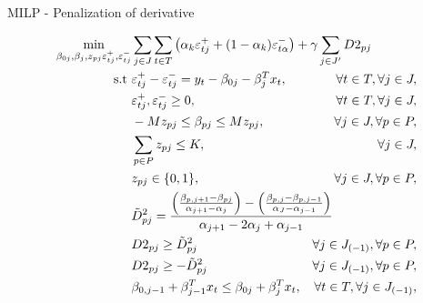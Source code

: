 \begin{frame}{MILP - Penalization of derivative}

\small

\begin{eqnarray*}
 \underset{\beta_{0j},\beta_j,z_{p j} \varepsilon_{t j}^{+},\varepsilon_{t j}^{-}}{\text{min}} & \sum_{j \in J} \sum_{t\in T}\left(\alpha_k \varepsilon_{t j}^{+}+(1-\alpha_k)\varepsilon_{t\alpha}^{-}\right) + \gamma \sum_{j \in J'} D2_{pj} \span \\
\mbox{s.t } & \varepsilon_{t j}^{+}-\varepsilon_{t j}^{-}=y_{t}-\beta_{0 j}-\beta_{j}^T x_{t},& \forall t \in T ,\forall j \in J, \\
& \varepsilon_{t j}^{+},\varepsilon_{t j}^{-}\geq0,&\forall t \in T ,\forall j \in J, \label{eq:mip2}\\
& - M z_{p j} \leq \beta_{p j} \leq M z_{p j},& \forall j \in J, \forall p\in P, \label{eq:mip3}\\
& \sum_{p \in P} z_{p j} \leq K, & \qquad \forall j \in J, \label{eq:mip4}\\
& z_{p j} \in \{0,1\},& \forall j \in J, \forall p\in P, \label{eq:mip5}\\
& \tilde{D}_{pj}^{2}=\frac{\left(\frac{\beta_{p,j+1}-\beta_{pj}}{\alpha_{j+1}-\alpha_{j}}\right)-\left(\frac{\beta_{p,j}-\beta_{p,j-1}}{\alpha_{J}-\alpha_{j-1}}\right)}{\alpha_{j+1}-2\alpha_{j}+\alpha_{j-1}} \span\\
& D2_{pj} \geq  \tilde D_{pj}^{2} &  \forall j \in J_{(-1)}, \forall p\in P, \\
& D2_{pj} \geq  - \tilde D_{pj}^{2} &  \forall j \in J_{(-1)}, \forall p\in P,\\
& \beta_{0,j-1} + \beta_{j-1}^T x_{t} \leq \beta_{0j} + \beta_{j}^T x_{t}, & \forall t \in T, \forall j \in J_{(-1)},
\end{eqnarray*}

\end{frame}

